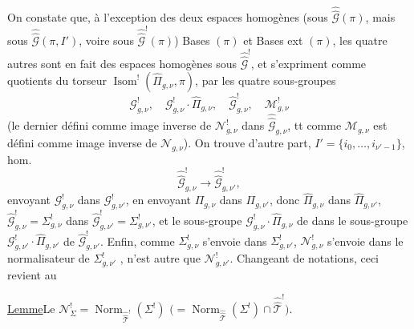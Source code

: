 On constate que, à l'exception des deux espaces homogènes
(sous $\widehat{\widehat{\mathcal G}}(\pi)$, mais   sous
$\widehat{\widehat{\mathcal G}}(\pi,I')$, voire sous
$\widehat{\widehat{\mathcal G}}^{!}(\pi)$) Bases $(\pi)$ et Bases ext $(\pi)$,
les quatre autres sont en fait des espaces homogènes sous
$\widehat{\widehat{\mathcal G}}^{!}$, et s'expriment comme quotients du
torseur
$\operatorname{Isom}^{!}(\widehat{\Pi}_{g,\nu},\pi)$, par les quatre sous-groupes
\[
\mathcal G^{!}_{g,\nu},\quad
\mathcal G^{!}_{g,\nu}\cdot\widehat{\Pi}_{g,\nu},\quad
\widehat{\mathcal G}^{!}_{g,\nu},\quad
\mathcal M^{!}_{g,\nu}
\]
(le dernier défini comme image inverse de $\mathcal N^{!}_{g,\nu}$ dans
$\widehat{\widehat{\mathcal G}}_{g,\nu}$, tt comme $\mathcal M_{g,\nu}$ est défini
comme image inverse de $\mathcal N_{g,\nu}$).
On trouve d'autre part,  $I'=\{i_0,\ldots,i_{\nu'-1}\}$,
 hom.
\[
\widehat{\widehat{\mathcal G}}^{!}_{g,\nu}\longrightarrow
\widehat{\widehat{\mathcal G}}^{!}_{g,\nu'},
\]
envoyant $\mathcal G^{!}_{g,\nu}$ dans $\mathcal G^{!}_{g,\nu'}$,
en envoyant $\Pi_{g,\nu}$ dans $\Pi_{g,\nu'}$, donc $\widehat{\Pi}_{g,\nu}$
dans $\widehat{\Pi}_{g,\nu'}$,
$\widehat{\mathcal G}^{!}_{g,\nu}=\Sigma^{!}_{g,\nu}$ dans
$\widehat{\mathcal G}^{!}_{g,\nu'}=\Sigma^{!}_{g,\nu'}$, et le sous-groupe
$\mathcal G^{!}_{g,\nu}\cdot\widehat{\Pi}_{g,\nu}$ de
dans le sous-groupe $\mathcal G^{!}_{g,\nu'}\cdot\widehat{\Pi}_{g,\nu'}$ de
$\widehat{\mathcal G}^{!}_{g,\nu'}$.
Enfin, comme $\Sigma^{!}_{g,\nu}$ s'envoie dans $\Sigma^{!}_{g,\nu'}$,
 $\mathcal N^{!}_{g,\nu}$ s'envoie dans le normalisateur
de $\Sigma^{!}_{g,\nu'}$ ,
 n'est autre que $\mathcal N^{!}_{g,\nu'}$.
Changeant de notations, ceci revient au

\uline{Lemme}\quad Le
$\mathcal N^{!}_{\Sigma}=\operatorname{Norm}_{\widehat{\widehat{\mathcal T}}^{!}}(\Sigma^{!})$
$\bigl(=\operatorname{Norm}_{\widehat{\widehat{\mathcal T}}}(\Sigma^{!})\cap
\widehat{\widehat{\mathcal T}}^{!}\bigr)$.



